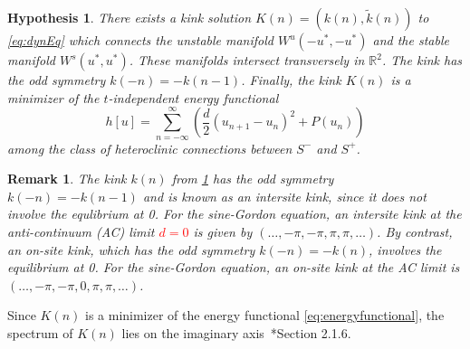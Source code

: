 \documentclass[12pt,reqno]{amsart}
\def\R{{\mathbb R}}
\newtheorem{hypothesis}{Hypothesis}
\newtheorem{remark}{Remark}
\newcommand{\revised}[1]{ \textcolor{red}{#1} }
\begin{document}
\begin{hypothesis}\label{hyp:kinkexists}
There exists a kink solution $K(n) = (k(n),\tilde{k}(n))$ to \cref{eq:dynEq} which connects the unstable manifold $W^u(-u^*, -u^*)$ and the stable manifold $W^s(u^*, u^*)$. These manifolds intersect transversely in $\R^2$. 
The kink has the odd symmetry $k(-n) = -k(n-1)$. Finally, 
the kink $K(n)$ is a minimizer of the $t$-independent energy functional
\begin{equation}\label{eq:energyfunctional}
h[u] = \sum_{n=-\infty}^\infty 
\left( \frac{d}{2} (u_{n+1} - u_n)^2 + P(u_n) \right)
\end{equation}
{among the class of heteroclinic connections between $S^-$ and $S^+$.}
\end{hypothesis}

\begin{remark}
The kink $k(n)$ from \cref{hyp:kinkexists} has the odd symmetry $k(-n) = -k(n-1)$ and is known as an intersite kink, since it does not involve the equlibrium at 0. For the sine-Gordon equation, an intersite kink at the anti-continuum (AC) limit 
\revised{$d = 0$} is given by $(\dots, -\pi, -\pi, \pi, \pi, \dots)$. By contrast, an on-site kink, which has the odd symmetry $k(-n) = -k(n)$, involves the equilibrium at 0. For the sine-Gordon equation, an on-site kink at the AC limit is $(\dots, -\pi, -\pi, 0, \pi, \pi, \dots)$. 
\end{remark}

{Since $K(n)$ is a minimizer of the energy functional \cref{eq:energyfunctional}, the spectrum of $K(n)$ lies on the imaginary axis~\cite{KevrekidisWeinstein2000}*{Section 2.1.6}.}
\end{document}

